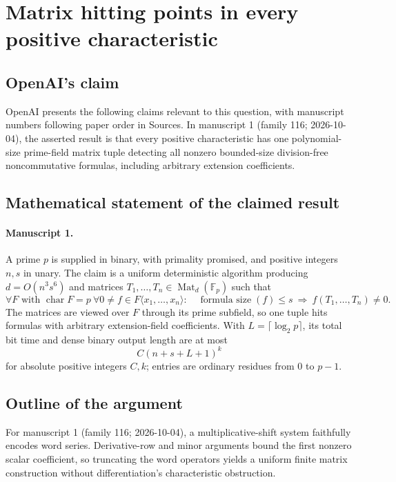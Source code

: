 \documentclass[11pt]{article}
\begin{document}
\section*{Matrix hitting points in every positive characteristic}

\subsection{OpenAI's claim}
OpenAI presents the following claims relevant to this question, with manuscript numbers following paper order in Sources. In manuscript 1 (family 116; 2026-10-04), the asserted result is that every positive characteristic has one polynomial-size prime-field matrix tuple detecting all nonzero bounded-size division-free noncommutative formulas, including arbitrary extension coefficients.

\subsection{Mathematical statement of the claimed result}
\paragraph{Manuscript 1.}
A prime $p$ is supplied in binary, with primality promised, and positive integers $n,s$ in unary. The claim is a uniform deterministic algorithm producing $d=O(n^3s^6)$ and matrices $T_1,\ldots,T_n\in\operatorname{Mat}_d(\mathbb F_p)$ such that
\[
 \forall F\text{ with }\operatorname{char}F=p\ \forall 0\ne f\in F\langle x_1,\ldots,x_n\rangle:
 \quad\operatorname{formula\ size}(f)\le s\ \Longrightarrow\ f(T_1,\ldots,T_n)\ne0.
\]
The matrices are viewed over $F$ through its prime subfield, so one tuple hits formulas with arbitrary extension-field coefficients. With $L=\lceil\log_2p\rceil$, its total bit time and dense binary output length are at most
\[
 C(n+s+L+1)^k
\]
for absolute positive integers $C,k$; entries are ordinary residues from $0$ to $p-1$.

\subsection{Outline of the argument}
For manuscript 1 (family 116; 2026-10-04), a multiplicative-shift system faithfully encodes word series. Derivative-row and minor arguments bound the first nonzero scalar coefficient, so truncating the word operators yields a uniform finite matrix construction without differentiation's characteristic obstruction.
\end{document}

